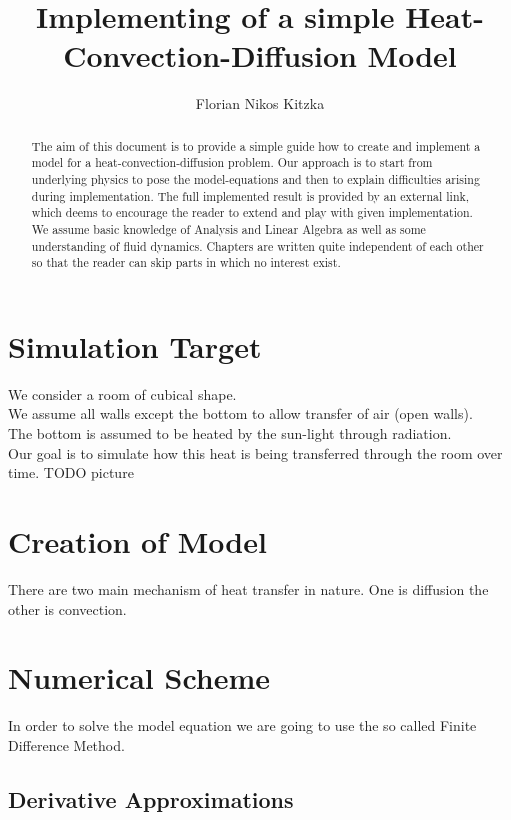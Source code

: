 \documentclass[]{article}
\title{Implementing of a simple Heat-Convection-Diffusion Model}
\author{Florian Nikos Kitzka}
\begin{document}
\maketitle

\begin{abstract}
The aim of this document is to provide a simple guide how to create and implement a model for a heat-convection-diffusion problem. Our approach is to start from underlying physics to pose the model-equations and then to explain difficulties arising during implementation.
The full implemented result is provided by an external link, which deems to encourage the reader to extend and play with given implementation.
We assume basic knowledge of Analysis and Linear Algebra as well as some understanding of 
fluid dynamics. Chapters are written quite independent of each other so that the reader
can skip parts in which no interest exist. 
\end{abstract}

\section{Simulation Target}
We consider a room of cubical shape.\\
We assume all walls except the bottom to allow transfer of air (open walls).\\
The bottom is assumed to be heated by the sun-light through radiation.\\
Our goal is to simulate how this heat is being transferred through the room over time.
TODO picture

\section{Creation of Model}
There are two main mechanism of heat transfer in nature. One is diffusion the other is convection.

\section{Numerical Scheme}
In order to solve the model equation we are going to use the so called
Finite Difference Method.

\subsection{Derivative Approximations}
\end{document}
